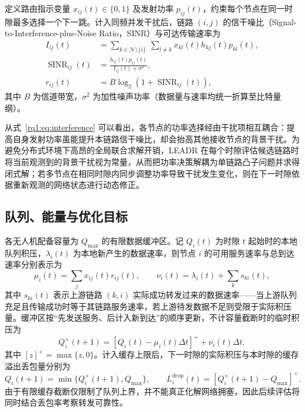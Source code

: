定义路由指示变量 $x_{ij}(t)\in\{0,1\}$ 及发射功率 $p_{ij}(t)$，约束每个节点在同一时隙最多选择一个下一跳。计入同频并发干扰后，链路 $(i,j)$ 的信干噪比（Signal-to-Interference-plus-Noise Ratio，SINR）与可达传输速率为
\begin{align}
 I_{ij}(t)&=\sum_{k\in\mathcal{N}\setminus\{i\}}\ \sum_{l\ne k}
              x_{kl}(t)h_{kj}(t)p_{kl}(t),
 \label{rq1:eq:interference}\\
 \operatorname{SINR}_{ij}(t)&=\frac{h_{ij}(t)p_{ij}(t)}{I_{ij}(t)+\sigma^2},
 \label{rq1:eq:sinr}\\
 r_{ij}(t)&=B\log_2\!\left(1+\operatorname{SINR}_{ij}(t)\right),
 \label{rq1:eq:rate}
\end{align}
其中 $B$ 为信道带宽，$\sigma^2$ 为加性噪声功率（数据量与速率均统一折算至比特量纲）。

从式~\eqref{rq1:eq:interference} 可以看出，各节点的功率选择经由干扰项相互耦合：提高自身发射功率虽能提升本链路信干噪比，却会抬高其他接收节点的背景干扰。为避免分布式环境下高昂的全局联合求解开销，LEADR 在每个时隙评估候选链路时将当前观测到的背景干扰视为常量，从而把功率决策解耦为单链路凸子问题并求得闭式解；若多节点在相同时隙内同步调整功率导致干扰发生变化，则在下一时隙依据重新观测的网络状态进行动态修正。

\subsection{队列、能量与优化目标}

各无人机配备容量为 $Q_{\max}$ 的有限数据缓冲区。记 $Q_i(t)$ 为时隙 $t$ 起始时的本地队列积压，$\lambda_i(t)$ 为本地新产生的数据速率，则节点 $i$ 的可用服务速率与总到达速率分别表示为
\begin{equation}
 \mu_i(t)=\sum_j x_{ij}(t)r_{ij}(t),\qquad
 \nu_i(t)=\lambda_i(t)+\sum_k s_{ki}(t),
 \label{rq1:eq:arrival_service}
\end{equation}
其中 $s_{ki}(t)$ 表示上游链路 $(k,i)$ 实际成功转发过来的数据速率——当上游队列充足且传输成功时等于其链路服务速率，若上游待发数据不足则受限于实际积压量。缓冲区按“先发送服务、后计入新到达”的顺序更新，不计容量截断时的临时积压为
\begin{equation}
 Q_i^{+}(t+1)=[Q_i(t)-\mu_i(t)\Delta t]^++\nu_i(t)\Delta t,
 \label{rq1:eq:queue_uncapped}
\end{equation}
其中 $[z]^+=\max\{z,0\}$。计入缓存上限后，下一时隙的实际积压与本时隙的缓存溢出丢包量分别为
\begin{equation}
 Q_i(t+1)=\min\{Q_i^{+}(t+1),Q_{\max}\},\qquad
 L_i^{\mathrm{drop}}(t)=[Q_i^{+}(t+1)-Q_{\max}]^+.
 \label{rq1:eq:queue_capped}
\end{equation}
由于有限缓存截断仅限制了队列上界，并不能真正化解网络拥塞，因此后续评估将同时结合丢包率考察转发可靠性。

